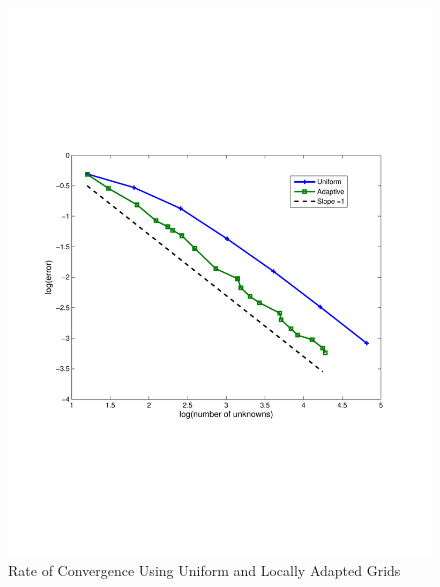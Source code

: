 \documentclass[preprint,10pt]{elsarticle}
\begin{document}
\begin{figure}[!hbtp]
\centering
\includegraphics[scale=0.5]{../pwld_diffusion/results/amr/cv_amr}
\caption{Rate of Convergence Using Uniform and Locally Adapted Grids}
\label{fig:conv_rate_amr}
\end{figure}
\end{document}
